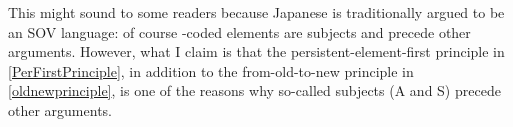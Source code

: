 \largerpage
This might sound  to some readers because Japanese is traditionally argued to be an SOV language:
of course -coded elements are subjects and precede other arguments.
However, what I claim is that
the persistent-element-first principle in \ref{PerFirstPrinciple}, in addition to the from-old-to-new principle in \ref{oldnewprinciple}, is one of the reasons why so-called subjects (A and S) precede other arguments.
%

